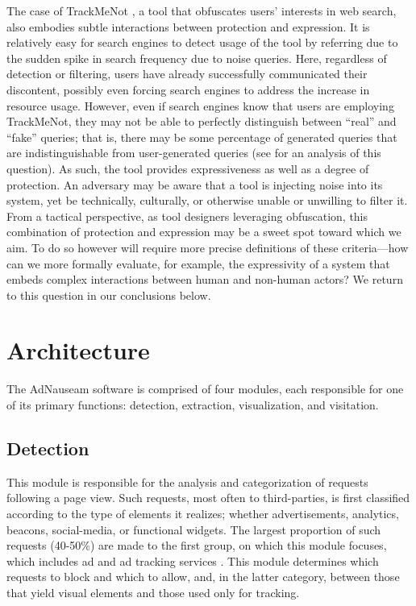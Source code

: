 \documentclass[conference]{IEEEtran}
\begin{document}
The case of TrackMeNot \cite{Howe-1}, a tool that obfuscates users' interests in web search, also embodies subtle interactions between protection and expression. It is relatively easy for search engines to detect usage of the tool by referring due to the sudden spike in search frequency due to noise queries. Here, regardless of detection or filtering, users have already successfully communicated their discontent, possibly even forcing search engines to address the increase in resource usage. However, even if search engines know that users are employing TrackMeNot, they may not be able to perfectly distinguish between “real” and “fake” queries; that is, there may be some percentage of generated queries that are indistinguishable from user-generated queries (see \cite{Gervais} for an analysis of this question). As such, the tool provides expressiveness as well as a degree of protection. An adversary may be aware that a tool is injecting noise into its system, yet be technically, culturally, or otherwise unable or unwilling to filter it. From a tactical perspective, as tool designers leveraging obfuscation, this combination of protection and expression may be a sweet spot toward which we aim. To do so however will require more precise definitions of these criteria---how can we more formally evaluate, for example, the expressivity of a system that embeds complex interactions between human and non-human actors? We return to this question in our conclusions below.


\section{Architecture}

The AdNauseam software is comprised of four modules, each responsible for one of its primary functions: detection, extraction, visualization, and visitation.

\subsection{Detection}

This module is responsible for the analysis and categorization of requests following a page view. Such requests, most often to third-parties, is first classified according to the type of elements it realizes; whether advertisements, analytics, beacons, social-media, or functional widgets. The largest proportion of such requests (40-50\%) are made to the first group, on which this module focuses, which includes ad and ad tracking services \cite{Wills}. This module determines which requests to block and which to allow, and, in the latter category, between those that yield visual elements and those used only for tracking.
\end{document}
